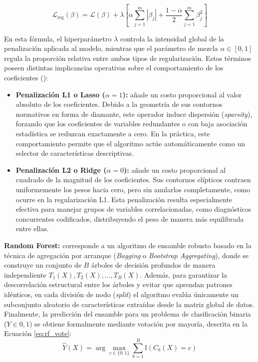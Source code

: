 \begin{equation}
    \mathcal{L}_{\text{reg}}(\beta) = \mathcal{L}(\beta) + \lambda \left[ \alpha \sum_{j=1}^{m} |\beta_j| + \frac{1-\alpha}{2} \sum_{j=1}^{m} \beta_j^2 \right]
    \label{eq:regularizacion}
\end{equation}

En esta fórmula, el hiperparámetro $\lambda$ controla la intensidad global de la penalización aplicada al modelo, mientras que el parámetro de mezcla $\alpha \in [0,1]$ regula la proporción relativa entre ambos tipos de regularización. Estos términos poseen distintas implicancias operativas sobre el comportamiento de los coeficientes (\cite{hastie2009elements}):

\begin{itemize}
\item \textbf{Penalización L1 o Lasso ($\alpha = 1$):} añade un costo proporcional al valor absoluto de los coeficientes. Debido a la geometría de sus contornos normativos en forma de diamante, este operador induce dispersión (\textit{sparsity}), forzando que los coeficientes de variables redundantes o con baja asociación estadística se reduzcan exactamente a cero. En la práctica, este comportamiento permite que el algoritmo actúe automáticamente como un selector de características descriptivas.
\item \textbf{Penalización L2 o Ridge ($\alpha = 0$):} añade un costo proporcional al cuadrado de la magnitud de los coeficientes. Sus contornos elípticos contraen uniformemente los pesos hacia cero, pero sin anularlos completamente, como ocurre en la regularización L1. Esta penalización resulta especialmente efectiva para manejar grupos de variables correlacionadas, como diagnósticos concurrentes codificados, distribuyendo el peso de manera más equilibrada entre ellas.
\end{itemize}



\textbf{Random Forest:} corresponde a un algoritmo de ensamble robusto basado en la técnica de agregación por arranque (\textit{Bagging} o \textit{Bootstrap Aggregating}), donde se construye un conjunto de $B$ árboles de decisión profundos de manera independiente ${T_1(X), T_2(X), \dots, T_B(X)}$. Además, para garantizar la descorrelación estructural entre los árboles y evitar que aprendan patrones idénticos, en cada división de nodo (\textit{split}) el algoritmo evalúa únicamente un subconjunto aleatorio de características extraídas desde la matriz global de datos. Finalmente, la predicción del ensamble para un problema de clasificación binaria ($Y \in {0,1}$) se obtiene formalmente mediante votación por mayoría, descrita en la Ecuación \ref{eq:rf_vote}:
\begin{equation}
    \hat{Y}(X) = \arg\max_{c \in \{0,1\}} \sum_{b=1}^{B} \mathbb{I}(C_b(X) = c)
    \label{eq:rf_vote}
\end{equation}

